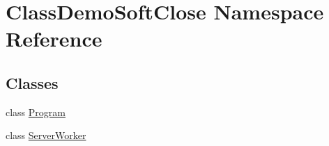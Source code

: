 \hypertarget{namespace_class_demo_soft_close}{}\section{Class\+Demo\+Soft\+Close Namespace Reference}
\label{namespace_class_demo_soft_close}
\subsection*{Classes}
\begin{DoxyCompactItemize}
\item 
class \mbox{\hyperlink{class_class_demo_soft_close_1_1_program}{Program}}
\item 
class \mbox{\hyperlink{class_class_demo_soft_close_1_1_server_worker}{Server\+Worker}}
\end{DoxyCompactItemize}
